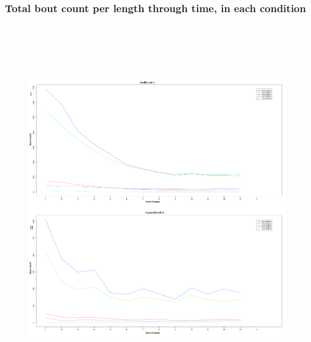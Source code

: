 \subsubsection{Total bout count per length through time, in each condition}

\begin{figure}[h!]
\begin{center}
\includegraphics[width=15cm,height=16cm]{countChangeTime1.png}
\end{center}
\end{figure}
\newpage
